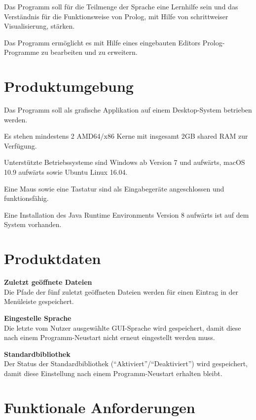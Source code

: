 \documentclass[parskip=full,11pt,twoside]{scrartcl}
\begin{document}
Das Programm soll für die Teilmenge der Sprache eine Lernhilfe sein und das Verständnis für die Funktionsweise von Prolog, mit Hilfe von schrittweiser Visualisierung, stärken.

Das Programm ermöglicht es mit Hilfe eines eingebauten Editors Prolog-Programme zu bearbeiten und zu erweitern.

\section{Produktumgebung}

Das Programm soll als grafische Applikation auf einem Desktop-System betrieben werden.

Es stehen mindestens 2 AMD64/x86 Kerne mit insgesamt 2GB shared RAM zur Verfügung.

Unterstützte Betriebssysteme sind Windows ab Version 7 und aufwärts, macOS 10.9 aufwärts sowie Ubuntu Linux 16.04.

Eine Maus sowie eine Tastatur sind als Eingabegeräte angeschlossen und funktionsfähig.

Eine Installation des Java Runtime Environments Version 8 aufwärts ist auf dem System vorhanden.

\section{Produktdaten}

\textbf{Zuletzt geöffnete Dateien} \\
Die Pfade der fünf zuletzt geöffneten Dateien werden für einen Eintrag in der Menüleiste gespeichert.

\textbf{Eingestelle Sprache} \\
Die letzte vom Nutzer ausgewählte GUI-Sprache wird gespeichert, damit diese nach einem Programm-Neustart nicht erneut eingestellt werden muss.

\textbf{Standardbibliothek} \\
Der Status der Standardbibliothek (\enquote{Aktiviert}/\enquote{Deaktiviert}) wird gespeichert, damit diese Einstellung nach einem Programm-Neustart erhalten bleibt.

\section{Funktionale Anforderungen}

\end{document}
